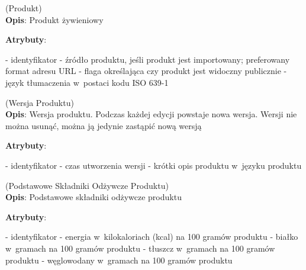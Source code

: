 \begin{enumerate}[label={\textbf{KAT/2/\protect\twodigits{\theenumi}}}, wide, labelwidth=!, labelindent=0pt, labelsep=0pt, series=reqs]
    \setlength\itemsep{1.75em}
    \label{kat:Product} (Produkt)\\
    \indent\textbf{Opis}: Produkt żywieniowy
    \par
    \textbf{Atrybuty}:
    \begin{itemize}[series=atr, wide, align=left, leftmargin=190pt]
        \label{kat:Product:id}- identyfikator
        \label{kat:Product:source}- źródło produktu, jeśli produkt jest importowany; preferowany format adresu URL
        \label{kat:Product:isPublic}- flaga określająca czy produkt jest widoczny publicznie
        \label{kat:Product:language}- język tłumaczenia w~postaci kodu ISO 639-1
    \end{itemize}

    \label{kat:ProductVersion} (Wersja Produktu)\\
    \indent\textbf{Opis}: Wersja produktu. Podczas każdej edycji powstaje nowa wersja. Wersji nie można usunąć, można ją jedynie zastąpić nową wersją
    \par
    \textbf{Atrybuty}:
    \begin{itemize}[series=atr, wide, align=left, leftmargin=190pt]
        \label{kat:ProductVersion:id}- identyfikator
        \label{kat:ProductVersion:createdDate}- czas utworzenia wersji
        \label{kat:ProductVersion:description}- krótki opis produktu w~języku produktu
    \end{itemize}

    \label{kat:ProductBasicNutritionData} (Podstawowe Składniki Odżywcze Produktu)\\
    \indent\textbf{Opis}: Podstawowe składniki odżywcze produktu
    \par
    \textbf{Atrybuty}:
    \begin{itemize}[series=atr, wide, align=left, leftmargin=190pt]
        \label{kat:ProductBasicNutritionData:id}- identyfikator
        \label{kat:ProductBasicNutritionData:energy}- energia w~kilokaloriach (kcal) na 100 gramów produktu
        \label{kat:ProductBasicNutritionData:protein}- białko w~gramach na 100 gramów produktu
        \label{kat:ProductBasicNutritionData:fat}- tłuszcz w~gramach na 100 gramów produktu
        \label{kat:ProductBasicNutritionData:carbohydrates}- węglowodany w~gramach na 100 gramów produktu
    \end{itemize}


\end{enumerate}
